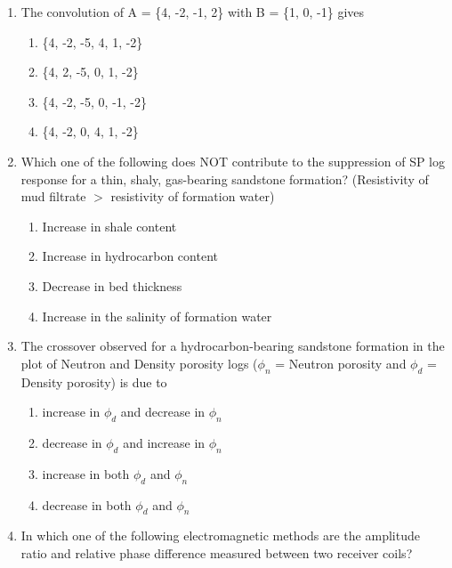 \documentclass[journal,12pt,onecolumn]{IEEEtran}
\begin{document}
\begin{enumerate}
\item The convolution of A = \{4, -2, -1, 2\} with B = \{1, 0, -1\} gives

\hfill{}
\begin{multicols}{2}
\begin{enumerate}
    \item \{4, -2, -5, 4, 1, -2\}
    \item \{4, 2, -5, 0, 1, -2\}
    \item \{4, -2, -5, 0, -1, -2\}
    \item \{4, -2, 0, 4, 1, -2\}
\end{enumerate}
\end{multicols}

\item Which one of the following does NOT contribute to the suppression of SP log response for a thin, shaly, gas-bearing sandstone formation? (Resistivity of mud filtrate $>$ resistivity of formation water)

\hfill{}
\begin{enumerate}
    \item Increase in shale content
    \item Increase in hydrocarbon content
    \item Decrease in bed thickness
    \item Increase in the salinity of formation water
\end{enumerate}

\item The crossover observed for a hydrocarbon-bearing sandstone formation in the plot of Neutron and Density porosity logs ($\phi_n$ = Neutron porosity and $\phi_d$ = Density porosity) is due to

\hfill{}
\begin{enumerate}
    \item increase in $\phi_d$ and decrease in $\phi_n$
    \item decrease in $\phi_d$ and increase in $\phi_n$
    \item increase in both $\phi_d$ and $\phi_n$
    \item decrease in both $\phi_d$ and $\phi_n$
\end{enumerate}

\item In which one of the following electromagnetic methods are the amplitude ratio and relative phase difference measured between two receiver coils?


\end{enumerate}
\end{document}
